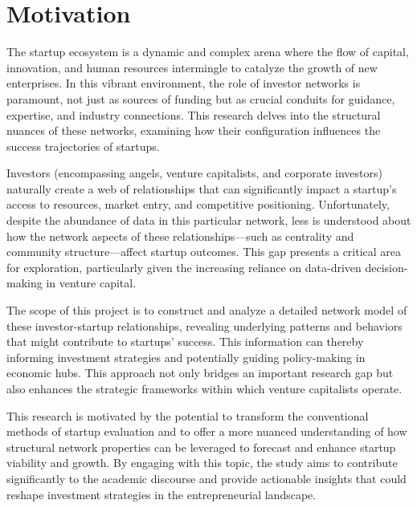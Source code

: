 \documentclass[a4paper,11pt]{article}
\begin{document}
\section{Motivation}
The startup ecosystem is a dynamic and complex arena where the flow of capital, innovation, and human resources intermingle to catalyze the growth of new enterprises. In this vibrant environment, the role of investor networks is paramount, not just as sources of funding but as crucial conduits for guidance, expertise, and industry connections. This research delves into the structural nuances of these networks, examining how their configuration influences the success trajectories of startups.

Investors (encompassing angels, venture capitalists, and corporate investors) naturally create a web of relationships that can significantly impact a startup’s access to resources, market entry, and competitive positioning. Unfortunately, despite the abundance of data in this particular network, less is understood about how the network aspects of these relationships—such as centrality and community structure—affect startup outcomes. This gap presents a critical area for exploration, particularly given the increasing reliance on data-driven decision-making in venture capital.

The scope of this project is to construct and analyze a detailed network model of these investor-startup relationships, revealing underlying patterns and behaviors that might contribute to startups' success. This information can thereby informing investment strategies and potentially guiding policy-making in economic hubs. This approach not only bridges an important research gap but also enhances the strategic frameworks within which venture capitalists operate.

This research is motivated by the potential to transform the conventional methods of startup evaluation and to offer a more nuanced understanding of how structural network properties can be leveraged to forecast and enhance startup viability and growth. By engaging with this topic, the study aims to contribute significantly to the academic discourse and provide actionable insights that could reshape investment strategies in the entrepreneurial landscape.
\end{document}
